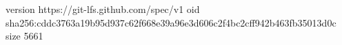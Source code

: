 version https://git-lfs.github.com/spec/v1
oid sha256:cddc3763a19b95d937c62f668e39a96e3d606c2f4bc2cff942b463fb35013d0c
size 5661
